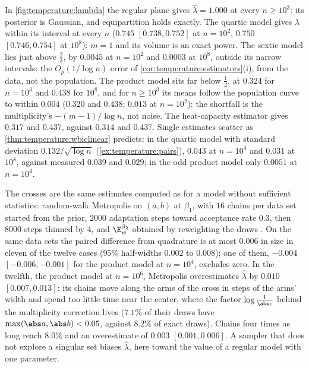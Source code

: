 \begin{refsection}
In \cref{fig:temperature:lambda} the regular plane gives $\hat\lambda=1.000$ at every $n\ge10^3$: its posterior is Gaussian, and equipartition holds exactly. The quartic model gives $\lambda$ within its interval at every $n$ ($0.745$ $[0.738,0.752]$ at $n=10^2$, $0.750$ $[0.746,0.754]$ at $10^8$): $m=1$ and its volume is an exact power. The sextic model lies just above $\frac23$, by $0.0045$ at $n=10^2$ and $0.0003$ at $10^8$, outside its narrow intervals: the $O_p(1/\log n)$ error of \cref{cor:temperature:estimators}(i), from the data, not the population. The product model sits far below $\frac12$, at $0.324$ for $n=10^3$ and $0.438$ for $10^8$, and for $n\ge10^3$ its means follow the population curve to within $0.004$ ($0.320$ and $0.438$; $0.013$ at $n=10^2$): the shortfall is the multiplicity's $-(m-1)/\log n$, not noise. The heat-capacity estimator gives $0.317$ and $0.437$, against $0.314$ and $0.437$. Single estimates scatter as \cref{thm:temperature:wbiclinear} predicts: in the quartic model with standard deviation $0.132/\sqrt{\log n}$ (\cref{ex:temperature:pairs}), $0.043$ at $n=10^4$ and $0.031$ at $10^8$, against measured $0.039$ and $0.029$; in the odd product model only $0.0051$ at $n=10^4$.

The crosses are the same estimates computed as for a model without sufficient statistics: random-walk Metropolis on $(a,b)$ at $\beta_1$, with $16$ chains per data set started from the prior, $2000$ adaptation steps toward acceptance rate $0.3$, then $8000$ steps thinned by $4$, and $\E^{\beta_2}_w$ obtained by reweighting the draws \parencite[eq.~(20)]{Watanabe2013}. On the same data sets the paired difference from quadrature is at most $0.006$ in size in eleven of the twelve cases ($95\%$ half-widths $0.002$ to $0.008$); one of them, $-0.004$ $[-0.006,-0.001]$ for the product model at $n=10^4$, excludes zero. In the twelfth, the product model at $n=10^6$, Metropolis overestimates $\hat\lambda$ by $0.010$ $[0.007,0.013]$: its chains move along the arms of the cross in steps of the arms' width and spend too little time near the center, where the factor $\log\frac1{\abs c}$ behind the multiplicity correction lives ($7.1\%$ of their draws have $\max(\abs a,\abs b)<0.05$, against $8.2\%$ of exact draws). Chains four times as long reach $8.0\%$ and an overestimate of $0.003$ $[0.001,0.006]$. A sampler that does not explore a singular set biases $\hat\lambda$, here toward the value of a regular model with one parameter.


\end{refsection}
